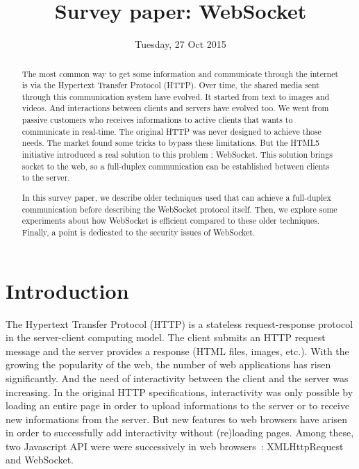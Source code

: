 \documentclass[journal,compsoc]{IEEEtran}
\newcommand{\ws}{WebSocket}
\begin{document}
\author{}

\title{Survey paper: \ws}

\date{Tuesday, 27 Oct 2015}

\maketitle
\IEEEpeerreviewmaketitle



\begin{abstract}
The most common way to get some information and communicate through the internet is via the Hypertext Transfer Protocol (HTTP).
Over time, the shared media sent through this communication system have evolved.
It started from text to images and videos.
And interactions between clients and servers have evolved too.
We went from passive customers who receives informations to active clients that wants to communicate in real-time.
The original HTTP was never designed to achieve those needs.
The market found some tricks to bypass these limitations.
But the HTML5 initiative introduced a real solution to this problem : \ws{}.
This solution brings socket to the web, so a full-duplex communication can be established between clients to the server.

In this survey paper, we describe older techniques used that can achieve a full-duplex communication before describing the \ws{} protocol itself.
Then, we explore some experiments about how \ws{} is efficient compared to these older techniques.
Finally, a point is dedicated to the security issues of \ws.
\end{abstract}


\section{Introduction}

The Hypertext Transfer Protocol (HTTP) is a stateless request-response protocol in the server-client computing model.
The client submits an HTTP request message and the server provides a response (HTML files, images, etc.).
With the growing the popularity of the web, the number of web applications has risen significantly.
And the need of interactivity between the client and the server was increasing.
In the original HTTP specifications, interactivity was only possible by loading an entire page in order to upload informations to the server or to receive new informations from the server.
But new features to web browsers have arisen in order to successfully add interactivity without (re)loading pages.
Among these, two Javascript API were were successively in web \mbox{browsers :} XMLHttpRequest and \ws.
\end{document}

